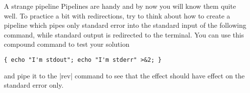 
\begin{exercise}[Technical]{A strange pipeline}
    Pipelines are handy and by now you will know them quite well.
    To practice a bit with redirections, try to think about how to create a pipeline which pipes only standard error into the standard input of the following command, while standard output is redirected to the terminal.
    You can use this compound command to test your solution
    \begin{lstlisting}[style=MyBash]
        { echo "I'm stdout"; echo "I'm stderr" >&2; }
    \end{lstlisting}
    and pipe it to the \bash|rev| command to see that the effect should have effect on the standard error only.
\end{exercise}
